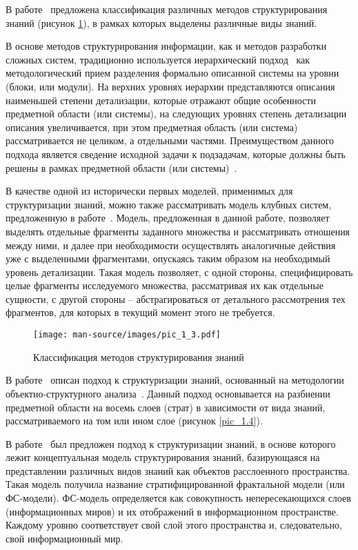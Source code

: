 В работе~\cite{Gavrilova2008} предложена классификация различных методов структурирования знаний (рисунок \ref{pic_1.3}), в рамках которых выделены различные виды знаний.

В основе методов структурирования информации, как и методов разработки сложных систем, традиционно используется иерархический подход~\cite{Mesarovich1978} как методологический прием разделения формально описанной системы на уровни (блоки, или модули). На верхних уровнях иерархии представляются описания наименьшей степени детализации, которые отражают общие особенности предметной области (или системы), на следующих уровнях степень детализации описания увеличивается, при этом предметная область (или система) рассматривается не целиком, а отдельными частями. Преимуществом данного подхода является сведение исходной задачи к подзадачам, которые должны быть решены в рамках предметной области (или системы)~\cite{Gavrilova2016}.

В качестве одной из исторически первых моделей, применимых для структуризации знаний, можно также рассматривать модель клубных систем, предложенную в работе~\cite{Borschev1976}. Модель, предложенная в данной работе, позволяет выделять отдельные фрагменты заданного множества и рассматривать отношения между ними, и далее при необходимости осуществлять аналогичные действия уже с выделенными фрагментами, опускаясь таким образом на необходимый уровень детализации. Такая модель позволяет, с одной стороны, специфицировать целые фрагменты исследуемого множества, рассматривая их как отдельные сущности, с другой стороны – абстрагироваться от детального рассмотрения тех фрагментов, для которых в текущий момент этого не требуется.

\begin{figure}[H]
\begin{center}
\texttt{[image: man-source/images/pic\_1\_3.pdf]}\\[2mm]
\caption{Классификация методов структурирования знаний}\label{pic_1.3}
\end{center}
\end{figure}

В работе~\cite{Gavrilova2016} описан подход к структуризации знаний, основанный на методологии объектно-структурного анализа~\cite{Gavrilova1995}. Данный подход основывается на разбиении предметной области на восемь слоев (страт) в зависимости от вида знаний, рассматриваемого на том или ином слое (рисунок \ref{pic_1.4}).

В работе~\cite{Krivorutski1995} был предложен подход к структуризации знаний, в основе которого лежит концептуальная модель структурирования знаний, базирующаяся на представлении различных видов знаний как объектов расслоенного пространства. Такая модель получила название стратифицированной фрактальной модели (или ФС-модели). ФС-модель определяется как совокупность непересекающихся слоев (информационных миров) и их отображений в информационном пространстве. Каждому уровню соответствует свой слой этого пространства и, следовательно, свой информационный мир.


